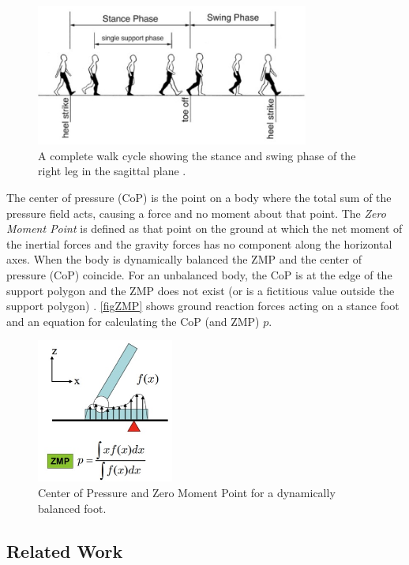 \documentclass[pdftex,11pt,a4paper]{report}
\begin{document}
\begin{figure} [ht]
\centering
\includegraphics[width=0.8\textwidth]{figures/WalkPhases.jpg}
\caption{A complete walk cycle showing the stance and swing phase of the right leg in the sagittal plane \cite{harrington05symptoms}.} \label{figWalkPhases}
\end{figure}

The center of pressure (CoP) is the point on a body where the total sum of the pressure field acts, causing a force and no moment about that point. The \emph{Zero Moment Point} is defined as that point on the ground at which the net moment of the inertial forces and the gravity forces has no component along the horizontal axes. When the body is dynamically balanced the ZMP and the center of pressure (CoP) coincide. For an unbalanced body, the CoP is at the edge of the support polygon and the ZMP does not exist (or is a fictitious value outside the support polygon) \cite{DBLP:journals/ijhr/VukobratovicB04}. \autoref{figZMP} shows ground reaction forces acting on a stance foot and an equation for calculating the CoP (and ZMP) $p$. 

\begin{figure} [ht]
\centering
\includegraphics[width=0.4\textwidth]{figures/ZMP.jpg}
\caption{Center of Pressure and Zero Moment Point for a dynamically balanced foot.} \label{figZMP}
\end{figure}

\subsection{Related Work}
\end{document}
